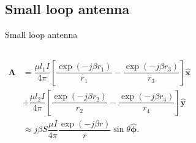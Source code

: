 \subsection{Small loop antenna}

\begin{frame}{Small loop antenna}
    \begin{columns}
        \begin{align*}
            \mathbf{A} &= \dfrac{\mu l_1 I}{4 \pi} \left[ \dfrac{\exp ( - j \beta r_1 )}{r_1} - \dfrac{\exp ( - j \beta r_3 )}{r_3} \right] \mathbf{\hat{x}} \\
            &+ \dfrac{\mu l_2 I}{4 \pi} \left[ \dfrac{\exp ( - j \beta r_2 )}{r_2} - \dfrac{\exp ( - j \beta r_4 )}{r_4} \right] \mathbf{\hat{y}} \\
            & \approx j \beta S \dfrac{\mu I}{4\pi} \dfrac{\exp ( - j \beta r )}{r} \sin \theta \mathbf{\hat{\phi}}.
        \end{align*}
        

\end{columns}
\end{frame}
